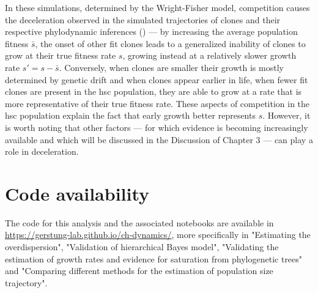 In these simulations, determined by the Wright-Fisher model, competition causes the deceleration observed in the simulated trajectories of clones and their respective phylodynamic inferences () --- by increasing the average population fitness $\bar{s}$, the onset of other fit clones leads to a generalized inability of clones to grow at their true fitness rate $s$, growing instead at a relatively slower growth rate $s' = s - \bar{s}$. Conversely, when clones are smaller their growth is mostly determined by genetic drift and when clones appear earlier in life, when fewer fit clones are present in the \ac{hsc} population, they are able to grow at a rate that is more representative of their true fitness rate. These aspects of competition in the \ac{hsc} population explain the fact that early growth better represents $s$. However, it is worth noting that other factors --- for which evidence is becoming increasingly available and which will be discussed in the Discussion of Chapter 3 --- can play a role in deceleration. 

\section{Code availability}

The code for this analysis and the associated notebooks are available in \url{https://gerstung-lab.github.io/ch-dynamics/}, more specifically in "Estimating the overdispersion", "Validation of hierarchical Bayes model", "Validating the estimation of growth rates and evidence for saturation from phylogenetic trees" and "Comparing different methods for the estimation of population size trajectory".